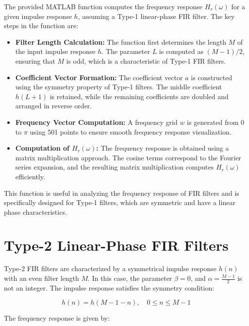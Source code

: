 \documentclass[a4paper,12pt]{article}
\begin{document}
The provided MATLAB function computes the frequency response \( H_r(\omega) \) for a given impulse response \( h \), assuming a Type-1 linear-phase FIR filter. The key steps in the function are:

\begin{itemize}
    \item \textbf{Filter Length Calculation:} The function first determines the length \( M \) of the input impulse response \( h \). The parameter \( L \) is computed as \( (M-1)/2 \), ensuring that \( M \) is odd, which is a characteristic of Type-1 FIR filters.
    
    \item \textbf{Coefficient Vector Formation:} The coefficient vector \( a \) is constructed using the symmetry property of Type-1 filters. The middle coefficient \( h(L+1) \) is retained, while the remaining coefficients are doubled and arranged in reverse order.
    
    \item \textbf{Frequency Vector Computation:} A frequency grid \( w \) is generated from 0 to \( \pi \) using 501 points to ensure smooth frequency response visualization.
    
    \item \textbf{Computation of \( H_r(\omega) \):} The frequency response is obtained using a matrix multiplication approach. The cosine terms correspond to the Fourier series expansion, and the resulting matrix multiplication computes \( H_r(\omega) \) efficiently.
\end{itemize}

This function is useful in analyzing the frequency response of FIR filters and is specifically designed for Type-1 filters, which are symmetric and have a linear phase characteristics.

\section{Type-2 Linear-Phase FIR Filters}

Type-2 FIR filters are characterized by a symmetrical impulse response \( h(n) \) with an even filter length \( M \). In this case, the parameter \( \beta = 0 \), and \( \alpha = \frac{M-1}{2} \) is not an integer. The impulse response satisfies the symmetry condition:

\[
h(n) = h(M-1-n), \quad 0 \leq n \leq M-1
\]

The frequency response is given by:
\end{document}
